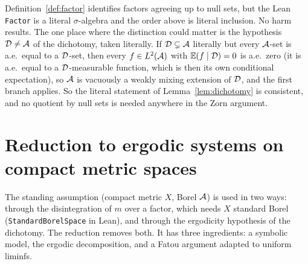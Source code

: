 \begin{remark}
  Definition~\ref{def:factor} identifies factors agreeing up to null sets, but the Lean
  \texttt{Factor} is a literal $\sigma$-algebra and the order above is literal inclusion.  No
  harm results.  The one place where the distinction could matter is the hypothesis
  $\mathcal{D} \neq \mathcal{A}$ of the dichotomy, taken literally.  If $\mathcal{D} \subsetneq \mathcal{A}$ literally but
  every $\mathcal{A}$-set is a.e.\ equal to a $\mathcal{D}$-set, then every $f \in L^2(\mathcal{A})$ with
  $\mathbb{E}(f\mid\mathcal{D}) = 0$ is a.e.\ zero (it is a.e.\ equal to a $\mathcal{D}$-measurable function, which
  is then its own conditional expectation), so $\mathcal{A}$ is vacuously a weakly mixing extension of
  $\mathcal{D}$, and the first branch applies.  So the literal statement of Lemma~\ref{lem:dichotomy}
  is consistent, and no quotient by null sets is needed anywhere in the Zorn argument.
\end{remark}

\section{Reduction to ergodic systems on compact metric spaces}

The standing assumption (compact metric $X$, Borel $\mathcal{A}$) is used in two ways: through the
disintegration of $m$ over a factor, which needs $X$ standard Borel
(\texttt{StandardBorelSpace} in Lean), and through the ergodicity hypothesis of the
dichotomy.  The reduction removes both.  It has three ingredients: a symbolic model, the
ergodic decomposition, and a Fatou argument adapted to uniform liminfs.

